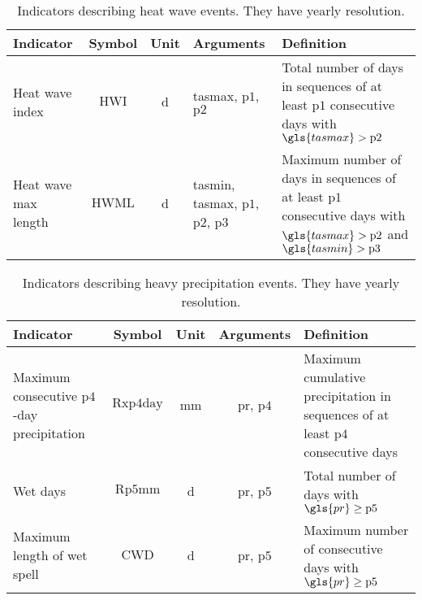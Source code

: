 \begin{table}
  \renewcommand*{\arraystretch}{1.5}
  \centering
  \caption{Indicators describing heat wave events. They have yearly resolution.}
  \label{tab:indicators_heat_wave}
  \begin{tabular}{p{}ccp{}p{}}
    Indicator            & Symbol          & Unit        & Arguments                                                               & Definition                                                                                                                                        \\
    \hline
    Heat wave index      & $\mathrm{HWI}$  & \unit{\day} & \gls{tasmax}, $\mathrm{p1}$, $\mathrm{p2}$                              & Total number of days in sequences of at least $\mathrm{p1}$ consecutive days with $\gls{tasmax} > \mathrm{p2}$                                    \\
    Heat wave max length & $\mathrm{HWML}$ & \unit{\day} & \gls{tasmin}, \gls{tasmax}, $\mathrm{p1}$, $\mathrm{p2}$, $\mathrm{p3}$ & Maximum number of days in sequences of at least $\mathrm{p1}$ consecutive days with $\gls{tasmax} > \mathrm{p2}$ and $\gls{tasmin} > \mathrm{p3}$ \\
  \end{tabular}
\end{table}
\begin{table}
  \renewcommand*{\arraystretch}{1.5}
  \centering
  \caption{Indicators describing heavy precipitation events. They have yearly resolution.}
  \label{tab:indicators_heavy_precipitation}
  \begin{tabular}{p{}cccp{}}
    Indicator                                           & Symbol             & Unit                & Arguments               & Definition                                                                               \\
    \hline
    Maximum consecutive $\mathrm{p4}$-day precipitation & $\mathrm{Rxp4day}$ & \unit{\milli\metre} & \gls{pr}, $\mathrm{p4}$ & Maximum cumulative precipitation in sequences of at least $\mathrm{p4}$ consecutive days \\
    Wet days                                            & $\mathrm{Rp5mm}$   & \unit{\day}         & \gls{pr}, $\mathrm{p5}$ & Total number of days with $\gls{pr} \geq \mathrm{p5}$                                    \\
    Maximum length of wet spell                         & $\mathrm{CWD}$     & \unit{\day}         & \gls{pr}, $\mathrm{p5}$ & Maximum number of consecutive days with $\gls{pr} \geq \mathrm{p5}$                      \\
  \end{tabular}
\end{table}

